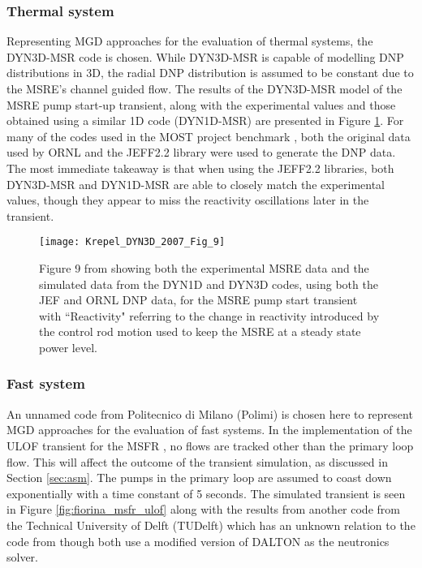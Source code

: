 \documentclass[review]{elsarticle}
\begin{document}
\subsubsection{Thermal system} \label{sssec:mgd_ts}
Representing MGD approaches for the evaluation of thermal systems, the DYN3D-MSR
code \cite{krepel_dyn3d-msr_2007} is chosen. While DYN3D-MSR is
capable of modelling DNP distributions in 3D, 
the radial DNP distribution is assumed to be constant
due to the MSRE's channel guided flow. \cite{krepel_dyn3d-msr_2007} 
The results of the DYN3D-MSR model of the MSRE pump start-up transient,
along with the experimental values and those obtained using a similar 1D code
(DYN1D-MSR) are presented in Figure \ref{fig:krepel_dyn3d_msre_pump_start}.
For many of the codes used in the
MOST project benchmark \cite{delpech_benchmark_2003}, both the original data used
by ORNL and the JEFF2.2 library were used to generate the DNP data. The most
immediate takeaway is that when using the JEFF2.2 libraries, both DYN3D-MSR and
DYN1D-MSR are able to closely match the experimental values, though they appear to
miss the reactivity oscillations later in the transient.

\begin{figure}[H]
   \centering
   \texttt{[image: Krepel\_DYN3D\_2007\_Fig\_9]}
   \caption{Figure 9 from \cite{krepel_dyn3d-msr_2007} showing both the experimental MSRE data
   and the simulated data from the DYN1D and DYN3D codes, using both the JEF and ORNL DNP data, for
   the MSRE pump start transient with ``Reactivity" referring to the change in reactivity introduced
   by the control rod motion used to keep the MSRE at a steady state power level.} 
   \label{fig:krepel_dyn3d_msre_pump_start}
\end{figure}

\subsubsection{Fast system} \label{sssec:mgd_fs}
An unnamed code
from Politecnico di Milano (Polimi) \cite{fiorina_modelling_2014} is chosen here to represent
MGD approaches for the evaluation of fast systems.
In the implementation of the ULOF transient for
the MSFR \cite{fiorina_modelling_2014}, no flows are tracked other than the primary
loop flow. This will affect the outcome of the transient simulation, as discussed in
Section \ref{sec:asm}. The pumps in the primary loop are assumed to
coast down exponentially with a time constant of 5 seconds. The simulated transient is
seen in Figure \ref{fig:fiorina_msfr_ulof} along with the results from another
code from the Technical University of Delft (TUDelft) which has an unknown relation to
the code from \cite{kophazi_development_2009} though both use a
modified version of DALTON as the neutronics solver. 
\end{document}
